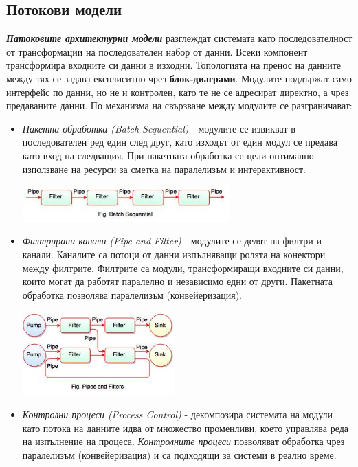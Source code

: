 \documentclass[fleqn,12pt]{article}
\begin{document}
\subsection{Потокови модели}

\textbf{\textit{Патоковите архитектурни модели}} разглеждат системата като последователност от трансформации на последователен набор от данни.
Всеки компонент трансформира входните си данни в изходни.
Топологията на пренос на данните между тях се задава експлиситно чрез \textbf{блок-диаграми}.
Модулите поддържат само интерфейс по данни, но не и контролен, като те не се адресират директно, а чрез предаваните данни.
\bigbreak
По механизма на свързване между модулите се разграничават:
\begin{itemize}
    \item \textit{Пакетна обработка (Batch Sequential)} - модулите се извикват в последователен ред един след друг, като изходът от един модул се предава като вход на следващия.
    При пакетната обработка се цели оптимално използване на ресурси за сметка на паралелизъм и интерактивност.
    \begin{center} \includegraphics[width=300px]{batch_sequential.jpg} \end{center}
    \item \textit{Филтрирани канали (Pipe and Filter)} - модулите се делят на филтри и канали.
    Каналите са потоци от данни изпълняващи ролята на конектори между филтрите.
    Филтрите са модули, трансформиращи входните си данни, които могат да работят паралелно и независимо едни от други.
    Пакетната обработка позволява паралелизъм (конвейеризация).
    \begin{center} \includegraphics[width=220px]{pipe_and_filter.jpg} \end{center}
    \item \textit{Контролни процеси (Process Control)} - декомпозира системата на модули като потока на данните идва от множество променливи, което управлява реда на изпълнение на процеса.
    \textit{Контролните процеси} позволяват обработка чрез паралелизъм (конвейеризация) и са подходящи за системи в реално време.
\end{itemize}
\end{document}
